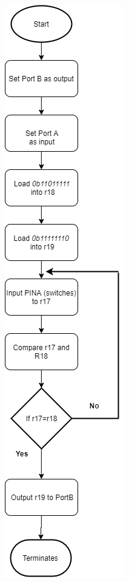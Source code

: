 \documentclass[a4paper,12pt]{article}
\begin{document}
\begin{center}
\includegraphics[scale=0.7]{img/Task3.png}
\end{center}

\newpage
\end{document}
